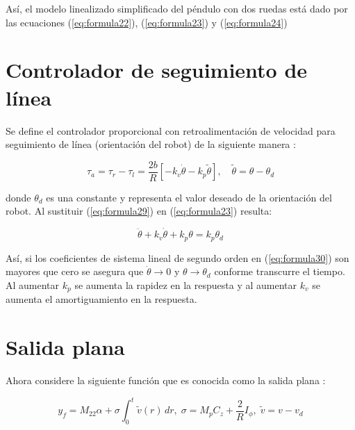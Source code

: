 \documentclass[11pt, twoside]{book}     %
\begin{document}
            \indent Así, el modelo linealizado simplificado del péndulo con dos ruedas está dado por las ecuaciones (\ref{eq:formula22}), (\ref{eq:formula23}) y (\ref{eq:formula24})
        \section{Controlador de seguimiento de línea}
    
            Se define el controlador proporcional con retroalimentación de velocidad para seguimiento de línea (orientación del robot) de la siguiente manera \citep{VMHGuzmancontrol2013}:

            \begin{equation}
                \boxed{\tau_a=\tau_r-\tau_l=\frac{2b}{R} \left[-k_v\dot{\theta}-k_p\tilde{\theta} \right], \quad \tilde{\theta} = \theta - \theta_d }
            \label{eq:formula29}
            \end{equation}

            \noindent donde $\theta_d$ es una constante y representa el valor deseado de la orientación del robot. Al sustituir (\ref{eq:formula29}) en (\ref{eq:formula23}) resulta:

            \begin{equation}
                [d_5 + I_\phi]\ddot{\theta}+k_v\dot{\theta}+k_p\theta=k_p\theta_d
                \label{eq:formula30}
            \end{equation}

            Así, si los coeficientes de sistema lineal de segundo orden en (\ref{eq:formula30}) son mayores que cero se asegura que $\dot{\theta} \rightarrow 0 $ y $\theta  \rightarrow \theta_d $ conforme transcurre el tiempo. Al aumentar $k_p$ se aumenta la rapidez en la respuesta y al aumentar $ k_v$ se aumenta el amortiguamiento en la respuesta.

        \section{Salida plana}
            Ahora considere la siguiente función que es conocida como la salida plana \citep{VMHGuzmancontrol2013}:
    
            \begin{equation}
                \boxed{y_f=M_{22}\alpha+\sigma \int_{0}^{t}\tilde{v}(r) \,dr, \; \sigma=M_pC_z+\frac{2}{R}I_\phi, \; \tilde{v}=v - v_d  }
                \label{eq:formula31}
            \end{equation}
\end{document}
